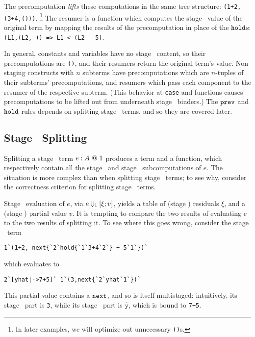The precomputation \emph{lifts} these computations in the same tree
structure: \verb|(1+2,(3+4,()))|.%
\footnote{In later examples, we will optimize out unnecessary \texttt{()}s.}
The resumer is a function which computes the stage \bbtwo\ value of the original
term by mapping the results of the precomputation in place of the ${\tt hold}$s:
\verb|(L1,(L2,_)) => L1 < (L2 - 5)|. 


In general, constants and variables have no stage \bbone\ content, so their
precomputations are \texttt{()}, and their resumers return the original term's
value. Non-staging constructs with $n$ subterms have precomputations which are
$n$-tuples of their subterms' precomputations, and resumers which pass each
component to the resumer of the respective subterm. (This behavior at
\texttt{case} and functions causes precomputations to be lifted out from
underneath stage \bbtwo\ binders.) The ${\tt prev}$ and ${\tt hold}$ rules depends on
splitting stage \bbone\ terms, and so they are covered later.

\subsection{Stage \bbone\ Splitting}

Splitting a stage \bbone\ term ${e}:{A}~@~ 1$ produces a term and a function,
which respectively contain all the stage \bbone\ and stage \bbtwo\
subcomputations of $e$. The situation is more complex than when splitting stage
\bbtwo\ terms; to see why, consider the correctness criterion for splitting
stage \bbone\ terms.

Stage \bbone\ evaluation of $e$, via $e\mathbin{{\Downarrow_{ 1}}}[\xi;v]$,
yields a table of (stage \bbtwo) residuals $\xi$, and a (stage \bbone) partial
value $v$. It is tempting to compare the two results of evaluating $e$ to the
two results of splitting it. To see where this goes wrong, consider the stage
\bbone\ term
\begin{lstlisting}
1`(1+2, next{`2`hold{`1`3+4`2`} + 5`1`})`
\end{lstlisting}
which evaluates to
\begin{lstlisting}
2`[yhat|->7+5]` 1`(3,next{`2`yhat`1`})`
\end{lstlisting}
This partial value contains a ${\tt next}$, and so is itself multistaged:
intuitively, its stage \bbone\ part is \texttt{3}, while its stage \bbtwo\ part
is $\mathtt{\hat{y}}$, which is bound to \texttt{7+5}.

